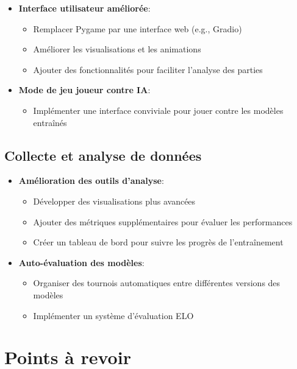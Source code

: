 \documentclass[]{article}
\begin{document}
\begin{itemize}
  \item \textbf{Interface utilisateur améliorée}:
    \begin{itemize}
      \item Remplacer Pygame par une interface web (e.g., Gradio)
      \item Améliorer les visualisations et les animations
      \item Ajouter des fonctionnalités pour faciliter l'analyse des parties
    \end{itemize}

  \item \textbf{Mode de jeu joueur contre IA}:
    \begin{itemize}
      \item Implémenter une interface conviviale pour jouer contre les modèles entraînés
    \end{itemize}
\end{itemize}

\subsection{Collecte et analyse de données}

\begin{itemize}
  \item \textbf{Amélioration des outils d'analyse}:
    \begin{itemize}
      \item Développer des visualisations plus avancées
      \item Ajouter des métriques supplémentaires pour évaluer les performances
      \item Créer un tableau de bord pour suivre les progrès de l'entraînement
    \end{itemize}

  \item \textbf{Auto-évaluation des modèles}:
    \begin{itemize}
      \item Organiser des tournois automatiques entre différentes versions des modèles
      \item Implémenter un système d'évaluation ELO
    \end{itemize}
\end{itemize}

\section{Points à revoir}
\end{document}
